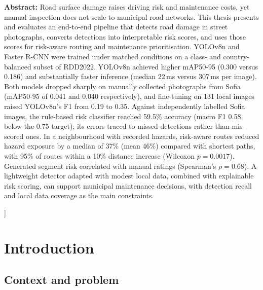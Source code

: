 \documentclass[10pt,a4paper,twocolumn]{article}
\begin{document}
\begin{@twocolumnfalse}
\begin{center}
\begin{minipage}{0.92\textwidth}
      \textbf{Abstract:}
      Road surface damage raises driving risk and maintenance costs, yet
      manual inspection does not scale to municipal road networks. This
      thesis presents and evaluates an end-to-end pipeline that detects road
      damage in street photographs, converts detections into interpretable
      risk scores, and uses those scores for risk-aware routing and
      maintenance prioritisation. YOLOv8n and Faster R-CNN were trained under
      matched conditions on a class- and country-balanced subset of RDD2022.
      YOLOv8n achieved higher mAP50-95 (0.300 versus 0.186) and substantially
      faster inference (median 22\,ms versus 307\,ms per image). Both models
      dropped sharply on manually collected photographs from Sofia
      (mAP50-95 of 0.041 and 0.040 respectively), and fine-tuning on 131 local images raised
      YOLOv8n's F1 from 0.19 to 0.35. Against independently labelled Sofia
      images, the rule-based risk classifier reached 59.5\% accuracy (macro
      F1 0.58, below the 0.75 target); its errors traced to missed detections
      rather than mis-scored ones. In a neighbourhood with recorded hazards,
      risk-aware routes reduced hazard exposure by a median of 37\% (mean 46\%)
      compared with shortest paths, with 95\% of routes within a 10\% distance
      increase (Wilcoxon $p = 0.0017$). Generated segment risk correlated with
      manual ratings (Spearman's $\rho = 0.68$). A lightweight detector adapted
      with modest local data, combined with explainable risk scoring, can
      support municipal maintenance decisions, with detection recall and local
      data coverage as the main constraints.
    \end{minipage}

    \vspace{6pt}
  \end{center}

  \end{@twocolumnfalse}
]

\section{Introduction}
\label{sec:introduction}

\subsection{Context and problem}
\label{sec:context-problem}
\end{document}
